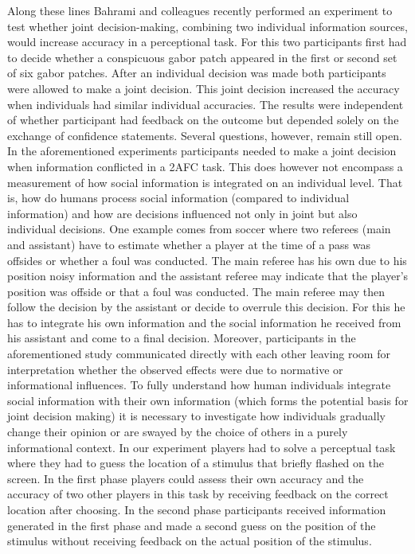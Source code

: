 \documentclass[jou]{apa}
\begin{document}
Along these lines Bahrami and colleagues \cite{bahrami_optimally_2010} recently performed an experiment to test whether joint decision-making, combining two individual information sources, would increase accuracy in a perceptional task. For this two participants first had to decide whether a conspicuous gabor patch appeared in the first or second set of six gabor patches. After an individual decision was made both participants were allowed to make a joint decision. This joint decision increased the accuracy when individuals had similar individual accuracies. The results were independent of whether participant had feedback on the outcome but depended solely on the exchange of confidence statements. Several questions, however, remain still open. In the aforementioned experiments participants needed to make a joint decision when information conflicted in a 2AFC task. This does however not encompass a measurement of how social information is integrated on an individual level. That is, how do humans process social information (compared to individual information) and how are decisions influenced not only in joint but also individual decisions. One example comes from soccer where two referees (main and assistant) have to estimate whether a player at the time of a pass was offsides or whether a foul was conducted. The main referee has his own due to his position noisy information and the assistant referee may indicate that the player's position was offside or that a foul was conducted. The main referee may then follow the decision by the assistant or decide to overrule this decision. For this he has to integrate his own information and the social information he received from his assistant and come to a final decision. Moreover, participants in the aforementioned study communicated directly with each other leaving room for interpretation whether the observed effects were due to normative or informational influences. To fully understand how human individuals integrate social information with their own information (which forms the potential basis for joint decision making) it is necessary to investigate how individuals gradually change their opinion or are swayed by the choice of others in a purely informational context. In our experiment players had to solve a perceptual task where they had to guess the location of a stimulus that briefly flashed on the screen. In the first phase players could assess their own accuracy and the accuracy of two other players in this task by receiving feedback on the correct location after choosing. In the second phase participants received information generated in the first phase and made a second guess on the position of the stimulus without receiving feedback on the actual position of the stimulus. 
\end{document}
